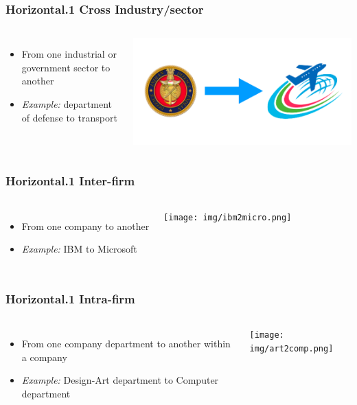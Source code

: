 \begin{frame}
\frametitle{Horizontal.1 Cross Industry/sector}
\begin{columns}
\begin{itemize}
	\item From one industrial or government sector to another
	\item \textit{Example:} department of defense to transport
\end{itemize}
\includegraphics[width=\textwidth]{img/def2trns.png}
\end{columns}
\end{frame}

\begin{frame}
\frametitle{Horizontal.1 Inter-firm}
\begin{columns}
\begin{itemize}
	\item From one company to another
	\item \textit{Example:} IBM to Microsoft
\end{itemize}
\texttt{[image: img/ibm2micro.png]}
\end{columns}
\end{frame}

\begin{frame}
\frametitle{Horizontal.1 Intra-firm}
\begin{columns}
\begin{itemize}
	\item From one company department to another within a company
	\item \textit{Example:} Design-Art department to Computer department
\end{itemize}
\texttt{[image: img/art2comp.png]}
\end{columns}
\end{frame}

